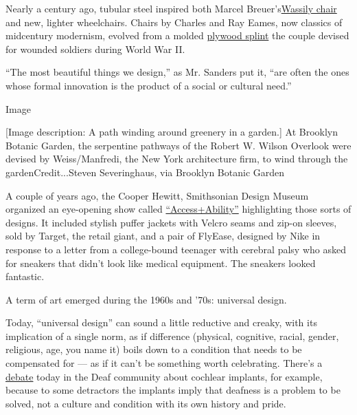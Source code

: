 Nearly a century ago, tubular steel inspired both Marcel
Breuer's\href{https://www.knoll.com/product/wassily-chair}{Wassily
chair} and new, lighter wheelchairs. Chairs by Charles and Ray Eames,
now classics of midcentury modernism, evolved from a molded
\href{https://hyperallergic.com/328930/leg-splint-shaped-iconic-eames-chair/}{plywood
splint} the couple devised for wounded soldiers during World War II.

``The most beautiful things we design,'' as Mr. Sanders put it, ``are
often the ones whose formal innovation is the product of a social or
cultural need.''

Image

{[}Image description: A path winding around greenery in a garden.{]} At
Brooklyn Botanic Garden, the serpentine pathways of the Robert W. Wilson
Overlook were devised by Weiss/Manfredi, the New York architecture firm,
to wind through the gardenCredit...Steven Severinghaus, via Brooklyn
Botanic Garden

A couple of years ago, the Cooper Hewitt, Smithsonian Design Museum
organized an eye-opening show called
\href{https://www.nytimes3xbfgragh.onion/2018/01/24/arts/design/cooper-hewitt-access-ability.html}{``Access+Ability''}
highlighting those sorts of designs. It included stylish puffer jackets
with Velcro seams and zip-on sleeves, sold by Target, the retail giant,
and a pair of FlyEase, designed by Nike in response to a letter from a
college-bound teenager with cerebral palsy who asked for sneakers that
didn't look like medical equipment. The sneakers looked fantastic.

A term of art emerged during the 1960s and '70s: universal design.

Today, ``universal design'' can sound a little reductive and creaky,
with its implication of a single norm, as if difference (physical,
cognitive, racial, gender, religious, age, you name it) boils down to a
condition that needs to be compensated for --- as if it can't be
something worth celebrating. There's a
\href{https://www.ncbi.nlm.nih.gov/pmc/articles/PMC6913847/\#:~:text=an\%20inspirational\%20video\%3F-,Sensationalizing\%20Cochlear\%20Implants,\%E2\%80\%9Cmiracle\%20cure\%E2\%80\%9D\%20for\%20deafness.\&text=When\%20the\%20implant\%20is\%20first,sudden\%20flood\%20of\%20sensory\%20inputs.}{debate}
today in the Deaf community about cochlear implants, for example,
because to some detractors the implants imply that deafness is a problem
to be solved, not a culture and condition with its own history and
pride.


